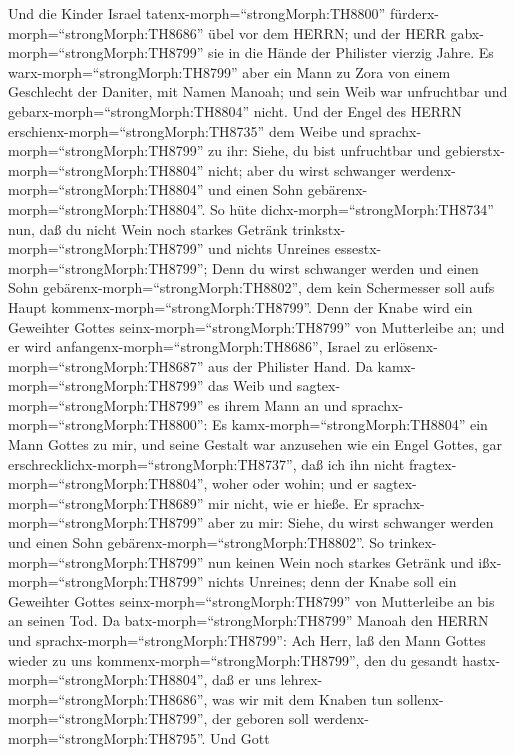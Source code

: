  Und die Kinder Israel tatenx-morph=``strongMorph:TH8800''
fürderx-morph=``strongMorph:TH8686'' übel vor dem HERRN; und der HERR
gabx-morph=``strongMorph:TH8799'' sie in die Hände der Philister vierzig
Jahre.  Es warx-morph=``strongMorph:TH8799'' aber ein Mann
zu Zora von einem Geschlecht der Daniter, mit Namen Manoah; und sein
Weib war unfruchtbar und gebarx-morph=``strongMorph:TH8804'' nicht.
 Und der Engel des HERRN
erschienx-morph=``strongMorph:TH8735'' dem Weibe und
sprachx-morph=``strongMorph:TH8799'' zu ihr: Siehe, du bist unfruchtbar
und gebierstx-morph=``strongMorph:TH8804'' nicht; aber du wirst
schwanger werdenx-morph=``strongMorph:TH8804'' und einen Sohn
gebärenx-morph=``strongMorph:TH8804''.  So hüte
dichx-morph=``strongMorph:TH8734'' nun, daß du nicht Wein noch starkes
Getränk trinkstx-morph=``strongMorph:TH8799'' und nichts Unreines
essestx-morph=``strongMorph:TH8799'';  Denn du wirst
schwanger werden und einen Sohn gebärenx-morph=``strongMorph:TH8802'',
dem kein Schermesser soll aufs Haupt
kommenx-morph=``strongMorph:TH8799''. Denn der Knabe wird ein Geweihter
Gottes seinx-morph=``strongMorph:TH8799'' von Mutterleibe an; und er
wird anfangenx-morph=``strongMorph:TH8686'', Israel zu
erlösenx-morph=``strongMorph:TH8687'' aus der Philister Hand.
 Da kamx-morph=``strongMorph:TH8799'' das Weib und
sagtex-morph=``strongMorph:TH8799'' es ihrem Mann an und
sprachx-morph=``strongMorph:TH8800'': Es
kamx-morph=``strongMorph:TH8804'' ein Mann Gottes zu mir, und seine
Gestalt war anzusehen wie ein Engel Gottes, gar
erschrecklichx-morph=``strongMorph:TH8737'', daß ich ihn nicht
fragtex-morph=``strongMorph:TH8804'', woher oder wohin; und er
sagtex-morph=``strongMorph:TH8689'' mir nicht, wie er hieße.
 Er sprachx-morph=``strongMorph:TH8799'' aber zu mir: Siehe,
du wirst schwanger werden und einen Sohn
gebärenx-morph=``strongMorph:TH8802''. So
trinkex-morph=``strongMorph:TH8799'' nun keinen Wein noch starkes
Getränk und ißx-morph=``strongMorph:TH8799'' nichts Unreines; denn der
Knabe soll ein Geweihter Gottes seinx-morph=``strongMorph:TH8799'' von
Mutterleibe an bis an seinen Tod.  Da
batx-morph=``strongMorph:TH8799'' Manoah den HERRN und
sprachx-morph=``strongMorph:TH8799'': Ach Herr, laß den Mann Gottes
wieder zu uns kommenx-morph=``strongMorph:TH8799'', den du gesandt
hastx-morph=``strongMorph:TH8804'', daß er uns
lehrex-morph=``strongMorph:TH8686'', was wir mit dem Knaben tun
sollenx-morph=``strongMorph:TH8799'', der geboren soll
werdenx-morph=``strongMorph:TH8795''.  Und Gott
